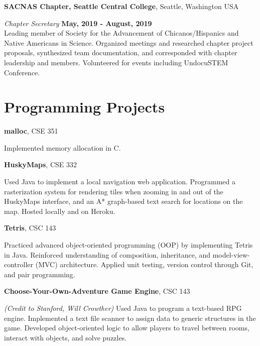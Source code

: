 \documentclass[margin,line]{res}
\begin{document}
\begin{resume}
{\bf SACNAS Chapter, Seattle Central College}, Seattle, Washington USA

\vspace{-.3cm}
{\em Chapter Secretary} \hfill {\bf May, 2019 - August, 2019}\\
Leading member of Society for the Advancement of Chicanos/Hispanics and Native Americans in Science.
  Organized meetings and researched chapter project proposals, synthesized team documentation, and 
  corresponded with chapter leadership and members. Volunteered for events including UndocuSTEM Conference.

\section{\sc Programming Projects}
{\bf malloc}, CSE 351

\vspace{-.3cm}
Implemented memory allocation in C.

{\bf HuskyMaps}, CSE 332

\vspace{-.3cm}
Used Java to implement a local navigation web application. Programmed a rasterization system for rendering tiles when zooming in and out of the HuskyMaps interface, and an A* graph-based text search for locations on the map. Hosted locally and on Heroku.

{\bf Tetris}, CSC 143

\vspace{-.3cm}
Practiced advanced object-oriented programming (OOP) by implementing Tetris in Java. Reinforced understanding of composition, inheritance, and model-view-controller (MVC) architecture. Applied unit testing, version control through Git, and pair programming.

{\bf Choose-Your-Own-Adventure Game Engine}, CSC 143

\vspace{-.3cm}
{\em (Credit to Stanford, Will Crowther)} Used Java to program a text-based RPG engine. Implemented a text file scanner to assign data to generic structures in the game. Developed object-oriented logic to allow players to travel between rooms, interact with objects, and solve puzzles.

\end{resume}
\end{document}
